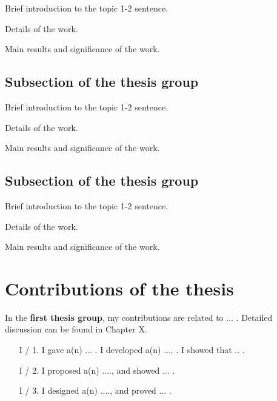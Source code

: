 \documentclass[12pt,a4paper]{extarticle}
\begin{document}
Brief introduction to the topic 1-2 sentence.

Details of the work.

Main results and significance of the work.

\subsection{Subsection of the thesis group}


Brief introduction to the topic 1-2 sentence.

Details of the work.

Main results and significance of the work.

\subsection{Subsection of the thesis group}


Brief introduction to the topic 1-2 sentence.

Details of the work.

Main results and significance of the work.

\vspace*{1em}

\section{Contributions of the thesis}

\vspace*{1em}

In the \textbf {first thesis group}, my contributions are related to ... . Detailed discussion can be found in Chapter X.
\vspace*{1em}
\begin{enumerate}[wide = 0pt, widest = {I/4.}, leftmargin =*]
    \item [I / 1.] I gave a(n) ... . I developed a(n) .... . 
    I showed that .. .
    
    \item [I / 2.] I proposed a(n) ...., and showed ... .
    
    \item [I / 3.] I designed a(n) ...., and proved ... .

\end{enumerate}
\end{document}
